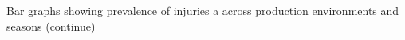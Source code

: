 Bar graphs showing  prevalence of injuries a across production environments and seasons (continue)
\label{fig:barplot3}